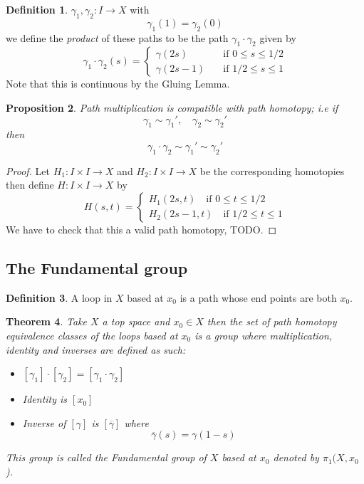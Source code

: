 \documentclass[11pt,a4paper]{article}
\theoremstyle{definition}
\newtheorem{definition}{Definition}[section]
\theoremstyle{plain}
\newtheorem{theorem}[definition]{Theorem}
\newtheorem{proposition}[definition]{Proposition}
\theoremstyle{remark}
\newcommand{\1}{\mathbbm{1}}
\begin{document}
\begin{definition}
    $\gamma_1, \gamma_2 \colon I \to X$ with 
    $$\gamma_1(1) = \gamma_2(0)$$
    we define the \emph{product} of these paths to be the path $\gamma_1 \cdot \gamma_2$ given by 
    $$\gamma_1 \cdot \gamma_2 (s) = \begin{cases}
        \gamma(2s) \quad &\text{if } 0 \leq s \leq 1/2 \\
        \gamma(2s - 1) \quad &\text{if } 1/2 \leq s \leq 1
    \end{cases}$$
    Note that this is continuous by the Gluing Lemma.
\end{definition}

\begin{proposition}
    Path multiplication is compatible with path homotopy; i.e if 
    $$\gamma_1 \sim \gamma_1', \quad \gamma_2 \sim \gamma_2'$$
    then 
    $$\gamma_1 \cdot \gamma_2 \sim \gamma_1' \sim \gamma_2'$$
\end{proposition}

\begin{proof}
    Let $H_1 \colon I \times I \to X$ and $H_2 \colon I \times I \to X$ be the corresponding homotopies 
    then define $H \colon I \times I \to X$ by 
    $$H(s,t) = \begin{cases}
        H_1(2s,t) \quad \text{if } 0 \leq t \leq 1/2 \\
        H_2(2s-1, t) \quad \text{if } 1/2 \leq t \leq 1
    \end{cases}$$
    We have to check that this a valid path homotopy, TODO.
\end{proof}

\subsection{The Fundamental group}
\begin{definition}
    A loop in $X$ based at $x_0$ is a path whose end points are both $x_0$.
\end{definition}

\begin{theorem}
    Take $X$ a top space and $x_0 \in X$ then the set of path homotopy equivalence classes of the loops based at $x_0$ is a group where 
    multiplication, identity and inverses are defined as such: 
    \begin{itemize}
        \item $[\gamma_1] \cdot [\gamma_2] = [\gamma_1 \cdot \gamma_2]$
        \item Identity is $[x_0]$ 
        \item Inverse of $[\gamma]$ is $[\overline{\gamma}]$ where 
        $$\overline{\gamma}(s) = \gamma(1-s)$$
    \end{itemize}
    This group is called the Fundamental group of $X$ based at $x_0$ denoted by $\pi_1(X, x_0$).
\end{theorem}
\end{document}
